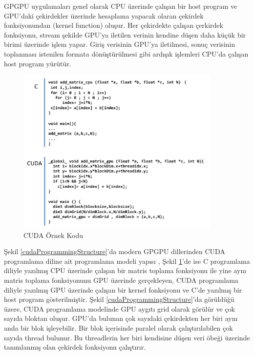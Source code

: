 GPGPU uygulamaları genel olarak CPU üzerinde çalışan bir host program ve GPU’daki çekirdekler üzerinde hesaplama yapacak olaran çekirdek fonksiyonundan (kernel function) oluşur. Her çekirdekte çalışan çerkirdek fonksiyonu, stream şekilde GPU’ya iletilen verinin kendine düşen daha küçük bir birimi üzerinde işlem yapar. Giriş verisinin GPU’ya iletilmesi, sonuç verisinin toplanması istenilen formata dönüştürülmesi gibi ardışık işlemleri CPU’da çalışan host program yürütür. \par
\begin{figure}[h]
\centering
\shorthandoff{=}
\includegraphics[width=0.9\textwidth]{gorsel/cudaCComparision.png}
\shorthandoff{=}
\caption{CUDA Örnek Kodu}
\label{image:cudaCComparision}
\end{figure}
Şekil \ref{cudaProgrammingStructure}’da modern GPGPU dillerinden CUDA programlama diline ait programlama modeli yapısı \cite{cudaProgrammingStructure},  Şekil \ref{image:cudaCComparision}’de ise C programlama diliyle yazılmış CPU üzerinde çalışan bir matris toplama fonksiyonu ile yine aynı matris toplama fonksiyonunu GPU üzerinde gerçekleyen, CUDA programlama diliyle yazılmış GPU üzerinde çalışan bir kernel fonksiyonu ve C’de yazılmış bir host program gösterilmiştir. Şekil \ref{cudaProgrammingStructure}’da görüldüğü üzere, CUDA programlama modelinde GPU aygıtı grid olarak görülür ve çok sayıda bloktan oluşur. GPU’da bulunan çok sayıdaki çekirdekten her biri aynı anda bir blok işleyebilir. Bir blok içerisinde paralel olarak çalıştırılabilen çok sayıda thread bulunur. Bu threadlerin her biri kendisine düşen veri öbeği üzerinde tanımlanmış olan çekirdek fonksiyonu çalıştırır.

